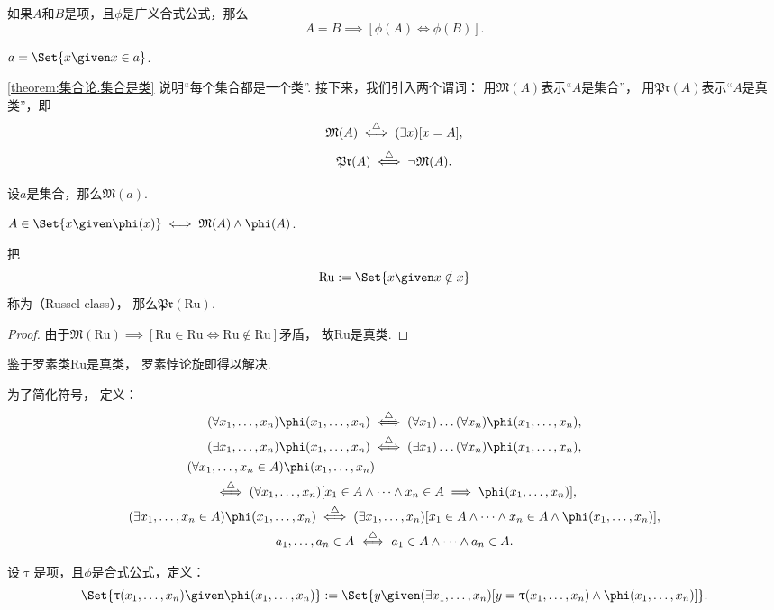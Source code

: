 \begin{theorem}
如果\(A\)和\(B\)是项，且\(\phi\)是广义合式公式，那么\begin{equation*}
	A=B \implies [\phi(A)\iff\phi(B)].
\end{equation*}
\end{theorem}

\begin{theorem}\label{theorem:集合论.集合是类}
\(a=\Set{ x \given x \in a }\).
\end{theorem}
\cref{theorem:集合论.集合是类} 说明“每个集合都是一个类”.
接下来，我们引入两个谓词：
用\(\mathfrak{M}(A)\)表示“\(A\)是集合”，
用\(\mathfrak{Pr}(A)\)表示“\(A\)是真类”，即\begin{equation*}
	\mathfrak{M}(A) \overset{\triangle}{\iff} (\exists x)[x = A],
\end{equation*}\begin{equation*}
	\mathfrak{Pr}(A) \overset{\triangle}{\iff} \neg\mathfrak{M}(A).
\end{equation*}

\begin{theorem}
设\(a\)是集合，那么\(\mathfrak{M}(a)\).
\end{theorem}

\begin{theorem}
\(A \in \Set{ x \given \phi(x) } \iff \mathfrak{M}(A) \land \phi(A)\).
\end{theorem}

\begin{theorem}
\def\Ru{\mathrm{Ru}}
把\begin{equation*}
	\Ru \defeq \Set{ x \given x \notin x }
\end{equation*}称为{\rm{}（Russel class）}，
那么\(\mathfrak{Pr}(\Ru)\).
\begin{proof}
由于\(\mathfrak{M}(\Ru)
\implies
[\Ru\in\Ru\iff\Ru\notin\Ru]\)矛盾，
故\(\Ru\)是真类.
\end{proof}
\end{theorem}
鉴于罗素类\(\mathrm{Ru}\)是真类，
罗素悖论旋即得以解决.

\begin{definition}
为了简化符号，
\def\x{x_1,\dotsc,x_n}
定义：\begin{gather}
	(\forall\x)\phi(\x)
	\defiff
	(\forall x_1)\dotso(\forall x_n)\phi(\x), \\
	(\exists\x)\phi(\x)
	\defiff
	(\exists x_1)\dotso(\forall x_n)\phi(\x), \\
	\begin{split}
		&\hspace{-20pt}
		(\forall\x\in A)\phi(\x) \\
		&\defiff
		(\forall\x)[x_1\in A \land \dotsb \land x_n\in A \implies \phi(\x)],
	\end{split} \\
	(\exists\x\in A)\phi(\x)
	\defiff
	(\exists\x)[x_1 \in A \land \dotsb \land x_n\in A \land \phi(\x)], \\
	a_1,\dotsc,a_n\in A \defiff a_1\in A \land \dotsb \land a_n\in A.
\end{gather}
\end{definition}

\begin{definition}
\def\x{x_1,\dotsc,x_n}
设\(\uptau\)是项，且\(\phi\)是合式公式，定义：\begin{equation}
	\Set{ \uptau(\x) \given \phi(\x) }
	\defeq
	\Set{ y \given (\exists\x)[y = \uptau(\x) \land \phi(\x)] }.
\end{equation}
\end{definition}
